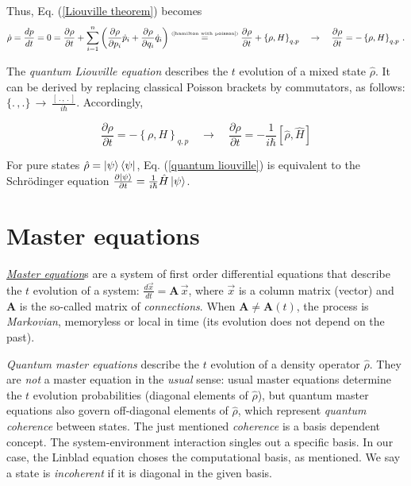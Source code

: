 \documentclass[11pt]{article}
\numberwithin{equation}{section} %
\numberwithin{figure}{section} %
\newcommand\numeq[1] %
  {\stackrel{\scriptscriptstyle(\mkern-1.5mu#1\mkern-1.5mu)}{=}}
\begin{document}
\begin{appendices}
Thus, Eq. (\ref{Liouville theorem}) becomes
\begin{equation} \label{Liouville equation}
\dot{\rho}=\frac{dp}{dt}=0=\frac{\partial\rho}{\partial t}+\sum_{i=1}^{n}\left( \frac{\partial\rho}{\partial p_i}\dot{p}_i+\frac{\partial\rho}{\partial q_i}\dot{q}_i \right)\numeq{\textrm{\ref{hamilton with poisson}}}\frac{\partial\rho}{\partial t}+\left\lbrace \rho,H \right\rbrace_{q,p}\quad\rightarrow\quad\frac{\partial\rho}{\partial t}=-\left\lbrace \rho,H \right\rbrace_{q,p}\,\textrm{.}
\end{equation}

The \emph{quantum Liouville equation} describes the $t$ evolution of a mixed state $\hat{\rho}$. It can be derived by replacing classical Poisson brackets by commutators, as follows: $\{.\,,.\}\,\rightarrow\,\frac{[\,.\,,\,.\,]}{i\hbar}$. Accordingly, $\,\,\,$ \cite[p.~185, Eq.~(3.4.29)]{Sakurai}

\begin{equation} \label{quantum liouville}
\frac{\partial\rho}{\partial t}=-\left\lbrace \rho,H \right\rbrace_{q,p}\quad\rightarrow\quad\frac{\partial\hat{\rho}}{\partial t}=-\frac{1}{i\hbar}[\hat{\rho},\hat{H}]
\end{equation}

For pure states $\hat{\rho}=\ket{\psi}\bra{\psi}$, Eq. (\ref{quantum liouville}) is equivalent to the Schrödinger equation $\frac{\partial\ket{\psi}}{\partial t}=\frac{1}{i\hbar}\hat{H}\ket{\psi}$.

\section{Master equations}
\href{https://en.wikipedia.org/wiki/Master_equation}{\emph{Master equation}}s are a system of first order differential equations that describe the $t$ evolution of a system: $\frac{d\vec{x}}{dt}=\mathbf{A}\,\vec{x}$, where $\vec{x}$ is a column matrix (vector) and $\mathbf{A}$ is the so-called matrix of \emph{connections}. When $\mathbf{A}\neq\mathbf{A}(t)$, the process is \emph{Markovian}, memoryless or local in time (its evolution does not depend on the past).

\emph{Quantum master equations} describe the $t$ evolution of a density operator $\hat{\rho}$.  They are \emph{not} a master equation in the \emph{usual} sense: usual master equations determine the $t$ evolution probabilities (diagonal elements of $\hat{\rho}$), but quantum master equations also govern off-diagonal elements of $\hat{\rho}$, which represent  \emph{quantum coherence} between states. The just mentioned \emph{coherence} is a basis dependent concept. The system-environment interaction singles out a specific basis. In our case, the Linblad equation choses the computational basis, as mentioned. We say a state is \emph{incoherent} if it is diagonal in the given basis.


\end{appendices}
\end{document}
